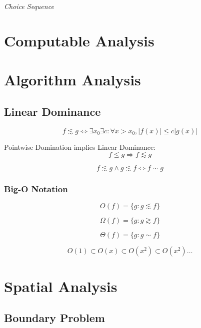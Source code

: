 \emph{Choice Sequence}

\section{Computable Analysis}\label{sec:computable_analysis}

\section{Algorithm Analysis}\label{sec:algorithm_analysis}

\subsection{Linear Dominance}\label{sec:linear_dominance}

\[
    f \lesssim g \Leftrightarrow
    \exists x_0 \exists c : \forall x > x_0, |f(x)| \leq c |g(x)|
\]

Pointwise Domination implies Linear Dominance:
\[
    f \leq g \Rightarrow f \lesssim g
\]

\[
    f \lesssim g \wedge g \lesssim f \Leftrightarrow f \sim g
\]



\subsubsection{Big-O Notation}\label{sec:bigo_notation}

\[
    O(f) = \{ g : g \lesssim f \}
\]

\[
    \Omega(f) = \{ g : g \gtrsim f \}
\]

\[
    \Theta(f) = \{ g : g \sim f \}
\]

\[
    O(1) \subset O(x) \subset O(x^2) \subset O(x^2) \ldots
\]



\section{Spatial Analysis}\label{sec:spatial_analysis}


\subsection{Boundary Problem}\label{sec:boundary_problem}

